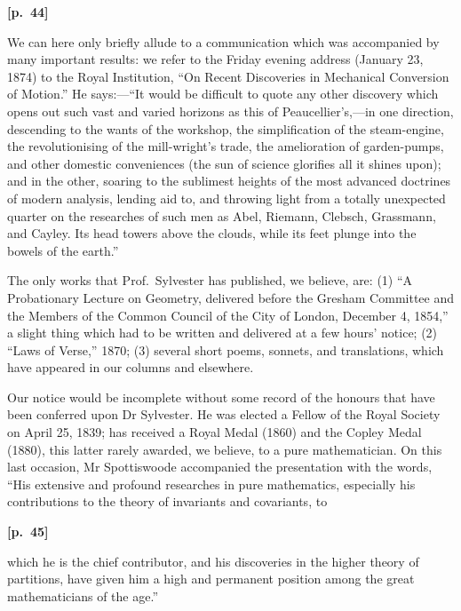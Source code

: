 \documentclass[11pt,a4paper]{book}
\begin{document}
\vspace{0.5em}
\noindent\textbf{[p.\ 44]}

We can here only briefly allude to a communication which was accompanied by many important results: we refer to the Friday evening address (January 23, 1874) to the Royal Institution, ``On Recent Discoveries in Mechanical Conversion of Motion.'' He says:---``It would be difficult to quote any other discovery which opens out such vast and varied horizons as this of Peaucellier's,---in one direction, descending to the wants of the workshop, the simplification of the steam-engine, the revolutionising of the mill-wright's trade, the amelioration of garden-pumps, and other domestic conveniences (the sun of science glorifies all it shines upon); and in the other, soaring to the sublimest heights of the most advanced doctrines of modern analysis, lending aid to, and throwing light from a totally unexpected quarter on the researches of such men as Abel, Riemann, Clebsch, Grassmann, and Cayley. Its head towers above the clouds, while its feet plunge into the bowels of the earth.''

The only works that Prof.\ Sylvester has published, we believe, are: (1) ``A Probationary Lecture on Geometry, delivered before the Gresham Committee and the Members of the Common Council of the City of London, December 4, 1854,'' a slight thing which had to be written and delivered at a few hours' notice; (2) ``Laws of Verse,'' 1870; (3) several short poems, sonnets, and translations, which have appeared in our columns and elsewhere.

Our notice would be incomplete without some record of the honours that have been conferred upon Dr Sylvester. He was elected a Fellow of the Royal Society on April 25, 1839; has received a Royal Medal (1860) and the Copley Medal (1880), this latter rarely awarded, we believe, to a pure mathematician. On this last occasion, Mr Spottiswoode accompanied the presentation with the words, ``His extensive and profound researches in pure mathematics, especially his contributions to the theory of invariants and covariants, to

\vspace{0.5em}
\noindent\textbf{[p.\ 45]}

which he is the chief contributor, and his discoveries in the higher theory of partitions, have given him a high and permanent position among the great mathematicians of the age.''
\end{document}
